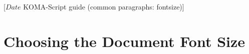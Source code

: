 %
%
%
%
%
%
%
%
% 
%
%
%
%

                 [$Date$
                  KOMA-Script guide (common paragraphs: fontsize)]


\section{Choosing the Document Font Size}
%
\BeginIndexGroup
{}%

